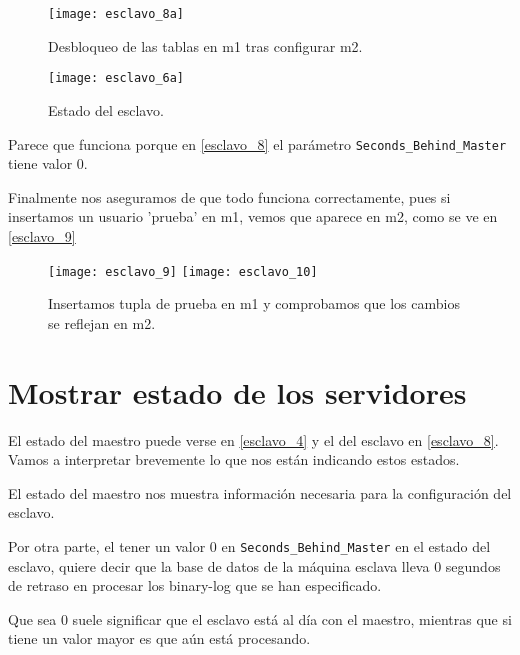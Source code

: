 \begin{figure}[h!]
\begin{center}
\caption{Desbloqueo de las tablas en m1 tras configurar m2.}
\label{esclavo_6}
\texttt{[image: esclavo\_8a]}
\end{center}
\end{figure}

\begin{figure}[h!]
\begin{center}
\caption{Estado del esclavo.}
\label{esclavo_8}
\texttt{[image: esclavo\_6a]}
\end{center}
\end{figure}

Parece que funciona porque en \eqref{esclavo_8} el parámetro \verb|Seconds_Behind_Master| tiene valor 0.

Finalmente nos aseguramos de que todo funciona correctamente, pues si insertamos un usuario 'prueba' en m1, vemos que aparece en m2, como se ve en \eqref{esclavo_9}

\begin{figure}[h!]
\begin{center}
\caption{Insertamos tupla de prueba en m1 y comprobamos que los cambios se reflejan en m2.}
\label{esclavo_9}
\texttt{[image: esclavo\_9]}
\texttt{[image: esclavo\_10]}
\end{center}
\end{figure}



\chapter{Mostrar estado de los servidores}

El estado del maestro puede verse en \eqref{esclavo_4} y el del esclavo en \eqref{esclavo_8}. Vamos a interpretar brevemente lo que nos están indicando estos estados.

El estado del maestro nos muestra información necesaria para la configuración del esclavo.

Por otra parte, el tener un valor $0$ en \verb|Seconds_Behind_Master| en el estado del esclavo, quiere decir que la base de datos de la máquina esclava lleva $0$ segundos de retraso en procesar los binary-log que se han especificado.

Que sea $0$ suele significar que el esclavo está al día con el maestro, mientras que si tiene un valor mayor es que aún está procesando.

